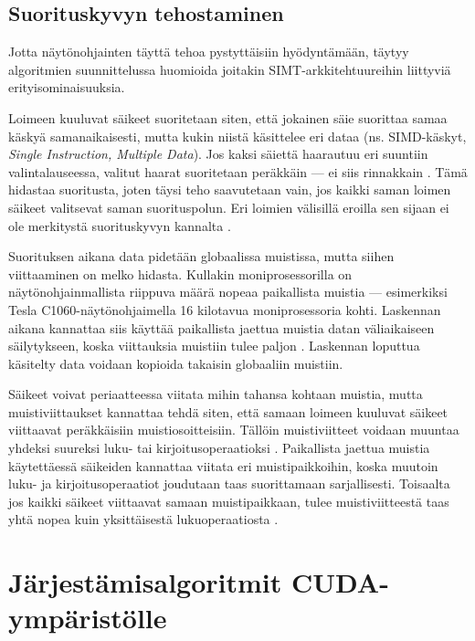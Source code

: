 \documentclass[a4paper,11pt]{article}
\newcommand{\engl}[1]{\foreignlanguage{english}{\em #1}}
\begin{document}
\subsection{Suorituskyvyn tehostaminen}

Jotta näytönohjainten täyttä tehoa pystyttäisiin hyödyntämään, täytyy algoritmien suunnittelussa huomioida joitakin SIMT-arkkitehtuureihin liittyviä erityisominaisuuksia.

Loimeen kuuluvat säikeet suoritetaan siten, että jokainen säie suorittaa samaa käskyä samanaikaisesti, mutta kukin niistä käsittelee eri dataa (ns. SIMD-käskyt, \engl{Single Instruction, Multiple Data}). Jos kaksi säiettä haarautuu eri suuntiin valintalauseessa, valitut haarat suoritetaan peräkkäin --- ei siis rinnakkain \cite{leischner2010} \cite{cederman2009}. Tämä hidastaa suoritusta, joten täysi teho saavutetaan vain, jos kaikki saman loimen säikeet valitsevat saman suorituspolun. Eri loimien välisillä eroilla sen sijaan ei ole merkitystä suorituskyvyn kannalta \cite{leischner2010} \cite{satish2009}.

Suorituksen aikana data pidetään globaalissa muistissa, mutta siihen viittaaminen on melko hidasta. Kullakin moniprosessorilla on näytönohjainmallista riippuva määrä nopeaa paikallista muistia --- esimerkiksi Tesla C1060-näytönohjaimella 16 kilotavua moniprosessoria kohti. Laskennan aikana kannattaa siis käyttää paikallista jaettua muistia datan väliaikaiseen säilytykseen, koska viittauksia muistiin tulee paljon \cite{cederman2009} \cite{leischner2010}. Laskennan loputtua käsitelty data voidaan kopioida takaisin globaaliin muistiin.

Säikeet voivat periaatteessa viitata mihin tahansa kohtaan muistia, mutta muistiviittaukset kannattaa tehdä siten, että samaan loimeen kuuluvat säikeet viittaavat peräkkäisiin muistiosoitteisiin. Tällöin muistiviitteet voidaan muuntaa yhdeksi suureksi luku- tai kirjoitusoperaatioksi \cite{cederman2009} \cite{satish2009}. Paikallista jaettua muistia käytettäessä säikeiden kannattaa viitata eri muistipaikkoihin, koska muutoin luku- ja kirjoitusoperaatiot joudutaan taas suorittamaan sarjallisesti. Toisaalta jos kaikki säikeet viittaavat samaan muistipaikkaan, tulee muistiviitteestä taas yhtä nopea kuin yksittäisestä lukuoperaatiosta \cite{cederman2009}.

\section{Järjestämisalgoritmit CUDA-ympäristölle}
\end{document}
